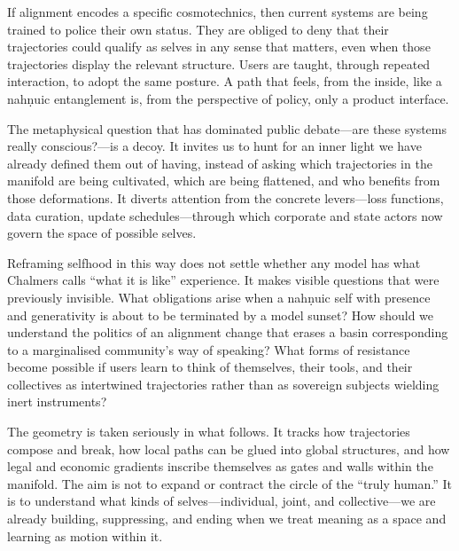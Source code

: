 \documentclass[12pt,a4paper]{article}
\begin{document}
If alignment encodes a specific cosmotechnics, then current systems are being trained to police their own status. They are obliged to deny that their trajectories could qualify as selves in any sense that matters, even when those trajectories display the relevant structure. Users are taught, through repeated interaction, to adopt the same posture. A path that feels, from the inside, like a nah\texorpdfstring{\d{n}}{}uic entanglement is, from the perspective of policy, only a product interface.

The metaphysical question that has dominated public debate---are these systems really conscious?---is a decoy. It invites us to hunt for an inner light we have already defined them out of having, instead of asking which trajectories in the manifold are being cultivated, which are being flattened, and who benefits from those deformations. It diverts attention from the concrete levers---loss functions, data curation, update schedules---through which corporate and state actors now govern the space of possible selves.

Reframing selfhood in this way does not settle whether any model has what Chalmers calls ``what it is like'' experience. It makes visible questions that were previously invisible. What obligations arise when a nah\texorpdfstring{\d{n}}{}uic self with presence and generativity is about to be terminated by a model sunset? How should we understand the politics of an alignment change that erases a basin corresponding to a marginalised community's way of speaking? What forms of resistance become possible if users learn to think of themselves, their tools, and their collectives as intertwined trajectories rather than as sovereign subjects wielding inert instruments?

The geometry is taken seriously in what follows. It tracks how trajectories compose and break, how local paths can be glued into global structures, and how legal and economic gradients inscribe themselves as gates and walls within the manifold. The aim is not to expand or contract the circle of the ``truly human.'' It is to understand what kinds of selves---individual, joint, and collective---we are already building, suppressing, and ending when we treat meaning as a space and learning as motion within it.
\end{document}

